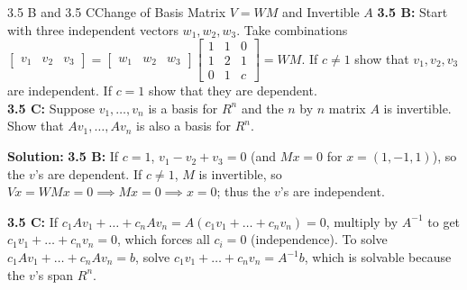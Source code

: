 \documentclass[11pt,a4paper,openany,oneside]{book}
\def\vect#1{#1}%
\def\mathbf#1{#1}%
\newcommand{\vect}[1]{\mathbf{#1}}
\numberwithin{equation}{chapter}
\begin{document}
\begin{example}{3.5 B and 3.5 C}{Change of Basis Matrix $V = WM$ and Invertible $A$}
\textbf{3.5 B:} Start with three independent vectors $\vect{w}_1, \vect{w}_2, \vect{w}_3$. Take combinations $\begin{bmatrix}\vect{v}_1 & \vect{v}_2 & \vect{v}_3\end{bmatrix} = \begin{bmatrix}\vect{w}_1 & \vect{w}_2 & \vect{w}_3\end{bmatrix}\begin{bmatrix}1 & 1 & 0\\1 & 2 & 1\\0 & 1 & c\end{bmatrix} = WM$. If $c\neq 1$ show that $\vect{v}_1, \vect{v}_2, \vect{v}_3$ are independent. If $c=1$ show that they are dependent.\\
\textbf{3.5 C:} Suppose $\vect{v}_1, \dots, \vect{v}_n$ is a basis for $\mathbf{R}^n$ and the $n$ by $n$ matrix $A$ is invertible. Show that $A\vect{v}_1, \dots, A\vect{v}_n$ is also a basis for $\mathbf{R}^n$.
\end{example}
\textbf{Solution:}
\textbf{3.5 B:} If $c=1$, $\vect{v}_1 - \vect{v}_2 + \vect{v}_3 = \vect{0}$ (and $M\vect{x}=\vect{0}$ for $\vect{x}=(1,-1,1)$), so the $\vect{v}$'s are dependent. If $c\neq 1$, $M$ is invertible, so $V\vect{x} = WM\vect{x} = \vect{0} \implies M\vect{x} = \vect{0} \implies \vect{x} = \vect{0}$; thus the $\vect{v}$'s are independent.

\textbf{3.5 C:} If $c_1A\vect{v}_1 + \dots + c_nA\vect{v}_n = A(c_1\vect{v}_1 + \dots + c_n\vect{v}_n) = \vect{0}$, multiply by $A^{-1}$ to get $c_1\vect{v}_1 + \dots + c_n\vect{v}_n = \vect{0}$, which forces all $c_i = 0$ (independence). To solve $c_1A\vect{v}_1 + \dots + c_nA\vect{v}_n = \vect{b}$, solve $c_1\vect{v}_1 + \dots + c_n\vect{v}_n = A^{-1}\vect{b}$, which is solvable because the $\vect{v}$'s span $\mathbf{R}^n$.
\end{document}

